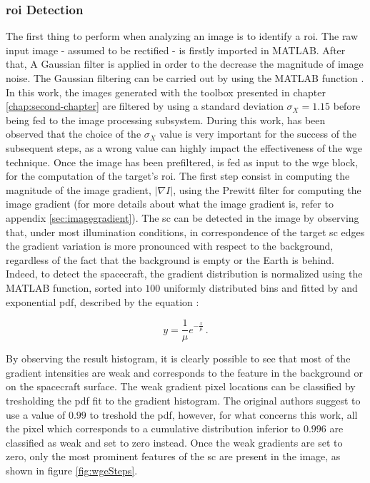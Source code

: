 \subsubsection{\acrshort{roi} Detection}
The first thing to perform when analyzing an image is to identify a \acrshort{roi}.
The raw input image - assumed to be rectified - is firstly imported in MATLAB. After that, A Gaussian filter is applied in order to the decrease the magnitude of image noise. The Gaussian filtering can be carried out by using the MATLAB function . In this work, the images generated with the toolbox presented in chapter \ref{chap:second-chapter} are filtered by using a standard deviation $\sigma_X = 1.15$ before being fed to the image processing subsystem. During this work, has been observed that the choice of the $\sigma_X$ value is very important for the success of the subsequent steps, as a wrong value can highly impact the effectiveness of the \acrshort{wge} technique. Once the image has been prefiltered, is fed as input to the \acrshort{wge} block, for the computation of the target's \acrshort{roi}. The first step consist in computing the magnitude of the image gradient, $|\nabla I|$,  using the Prewitt filter for computing the image gradient (for more details about what the image gradient is, refer to appendix \ref{sec:imagegradient}).
The \acrshort{sc} can be detected in the image by observing that, under most illumination conditions, in correspondence of the target \acrshort{sc} edges the gradient variation is more pronounced with respect to the background, regardless of the fact that the background is empty or the Earth is behind.
Indeed, to detect the spacecraft, the gradient distribution is normalized using the MATLAB  function, sorted into $100$ uniformly distributed bins and fitted by and exponential \acrfull{pdf}, described by the equation :

\begin{equation*}
  y = \frac{1}{\mu} e^{-\frac{x}{\mu}} \,.
\end{equation*}

By observing the result histogram, it is clearly possible to see that most of the gradient intensities are weak and corresponds to the feature in the background or on the spacecraft surface. The weak gradient pixel locations can be classified by tresholding the \acrshort{pdf} fit to the gradient histogram. The original authors suggest to use a value of $0.99$ to treshold the \acrshort{pdf}, however, for what concerns this work, all the pixel which corresponds to a cumulative distribution inferior to $0.996$ are classified as weak and set to zero instead. Once the weak gradients are set to zero, only the most prominent features of the \acrshort{sc} are present in the image, as shown in figure \ref{fig:wgeSteps}.

